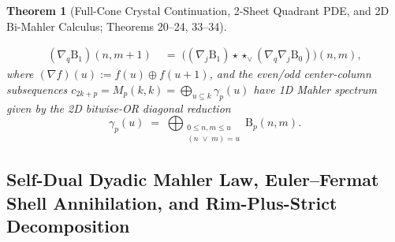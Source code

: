 \documentclass[11pt,a4paper]{article}
\newtheorem{theorem}{Theorem}[section]
\theoremstyle{definition}
\theoremstyle{remark}
\begin{document}
\begin{theorem}[Full-Cone Crystal Continuation, 2-Sheet Quadrant PDE, and 2D Bi-Mahler Calculus; Theorems 20--24, 33--34]
\begin{enumerate}
\begin{align}
    (\nabla_q \mathrm{B}_1)(n, m+1) &\;=\; \bigl((\nabla_j \mathrm{B}_1) \star\star_{\lor} (\nabla_q \nabla_j \mathrm{B}_0)\bigr)(n, m),
  \end{align}
  where $(\nabla f)(u) := f(u) \oplus f(u+1)$, and the even/odd center-column subsequences $c_{2k+p} = M_p(k,k) = \bigoplus_{u \subseteq k} \gamma_p(u)$ have 1D Mahler spectrum given by the 2D bitwise-OR diagonal reduction
  \begin{equation}
    \gamma_p(u) \;=\; \bigoplus_{\substack{0 \le n, m \le u \\ (n \;\lor\; m) = u}} \mathrm{B}_p(n, m).
  \end{equation}
\end{enumerate}
\end{theorem}

\subsection{Self-Dual Dyadic Mahler Law, Euler--Fermat Shell Annihilation, and Rim-Plus-Strict Decomposition}
\end{document}
